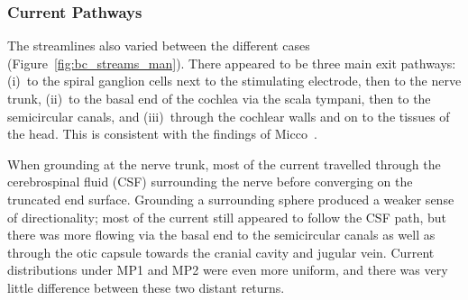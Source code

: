 \subsubsection{Current Pathways}

The streamlines also varied between the different cases
(Figure~\ref{fig:bc_streams_man}). There appeared to be three main exit
pathways: (i)~to the spiral ganglion cells next to the stimulating electrode,
then to the nerve trunk, (ii)~to the basal end of the cochlea via the scala
tympani, then to the semicircular canals, and (iii)~through the cochlear walls
and on to the tissues of the head. This is consistent with the findings of
Micco~\cite{micco2006}.

When grounding at the nerve trunk, most of the current travelled through the
cerebrospinal fluid (CSF) surrounding the nerve before converging on the
truncated end surface. Grounding a surrounding sphere produced a weaker sense of
directionality; most of the current still appeared to follow the CSF path, but
there was more flowing via the basal end to the semicircular canals as well as
through the otic capsule towards the cranial cavity and jugular vein. Current
distributions under MP1 and MP2 were even more uniform, and there was very
little difference between these two distant returns.


